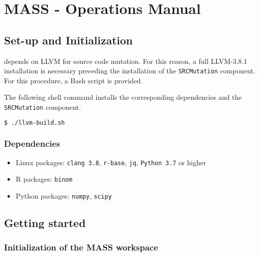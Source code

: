 
\chapter{MASS - Operations Manual}

\section{Set-up and Initialization}
\label{sec:install}

\MASS depends on LLVM for source code mutation. For this reason, a full LLVM-3.8.1 installation is necessary preceding the installation of the \texttt{SRCMutation} component. For this procedure, a Bash script is provided.

The following shell command installs the corresponding dependencies and the \texttt{SRCMutation} component.

\begin{lstlisting}[language=bash]
  $ ./llvm-build.sh
\end{lstlisting}

\subsection{Dependencies}


\begin{itemize}
	\item Linux packages: \texttt{clang 3.8}, \texttt{r-base}, \texttt{jq}, \texttt{Python 3.7} or higher
	\item R packages: \texttt{binom}
	\item Python packages: \texttt{numpy}, \texttt{scipy}
\end{itemize}


\section{Getting started}

\subsection{Initialization of the MASS workspace}


